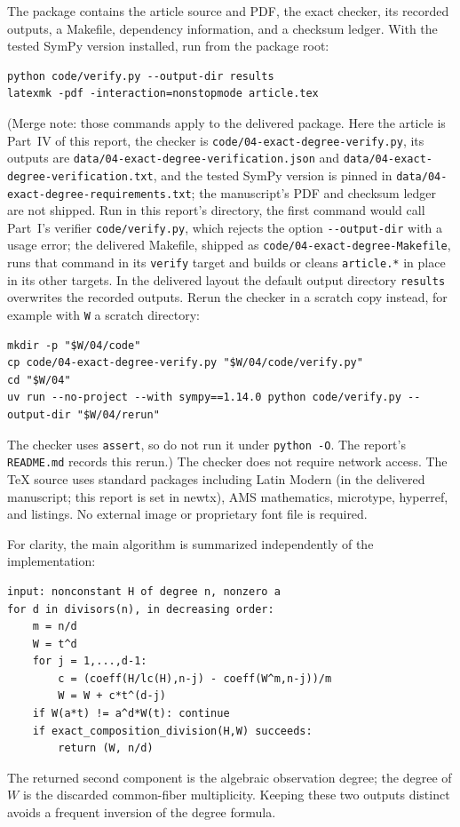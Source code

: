 \documentclass[11pt,letterpaper]{article}
\theoremstyle{definition}
\theoremstyle{remark}
\begin{document}
The package contains the article source and PDF, the exact checker, its recorded
outputs, a Makefile, dependency information, and a checksum ledger. With the tested
SymPy version installed, run from the package root:
\begin{lstlisting}
python code/verify.py --output-dir results
latexmk -pdf -interaction=nonstopmode article.tex
\end{lstlisting}
(Merge note: those commands apply to the delivered package. Here the article is
Part~IV of this report, the checker is \nolinkurl{code/04-exact-degree-verify.py},
its outputs are \nolinkurl{data/04-exact-degree-verification.json} and
\nolinkurl{data/04-exact-degree-verification.txt}, and the tested SymPy version is
pinned in \nolinkurl{data/04-exact-degree-requirements.txt}; the manuscript's PDF
and checksum ledger are not shipped. Run in this report's directory, the first
command would call Part~I's verifier \texttt{code/verify.py}, which rejects the
option \texttt{-{}-output-dir} with a usage error; the delivered Makefile, shipped
as \nolinkurl{code/04-exact-degree-Makefile}, runs that command in its
\texttt{verify} target and builds or cleans \texttt{article.*} in place in its
other targets. In the delivered layout the default output directory
\texttt{results} overwrites the recorded outputs. Rerun the checker in a scratch
copy instead, for example with \texttt{W} a scratch directory:
\begin{lstlisting}
mkdir -p "$W/04/code"
cp code/04-exact-degree-verify.py "$W/04/code/verify.py"
cd "$W/04"
uv run --no-project --with sympy==1.14.0 python code/verify.py --output-dir "$W/04/rerun"
\end{lstlisting}
The checker uses \texttt{assert}, so do not run it under \texttt{python -O}.
The report's \texttt{README.md} records this rerun.)
The checker does not require network access. The TeX source uses standard packages
including Latin Modern (in the delivered manuscript; this report is set in newtx), AMS mathematics, microtype, hyperref, and listings.
No external image or proprietary font file is required.

For clarity, the main algorithm is summarized independently of the implementation:
\begin{lstlisting}
input: nonconstant H of degree n, nonzero a
for d in divisors(n), in decreasing order:
    m = n/d
    W = t^d
    for j = 1,...,d-1:
        c = (coeff(H/lc(H),n-j) - coeff(W^m,n-j))/m
        W = W + c*t^(d-j)
    if W(a*t) != a^d*W(t): continue
    if exact_composition_division(H,W) succeeds:
        return (W, n/d)
\end{lstlisting}
The returned second component is the algebraic observation degree; the degree
of $W$ is the discarded common-fiber multiplicity. Keeping these two outputs
distinct avoids a frequent inversion of the degree formula.
\end{document}
